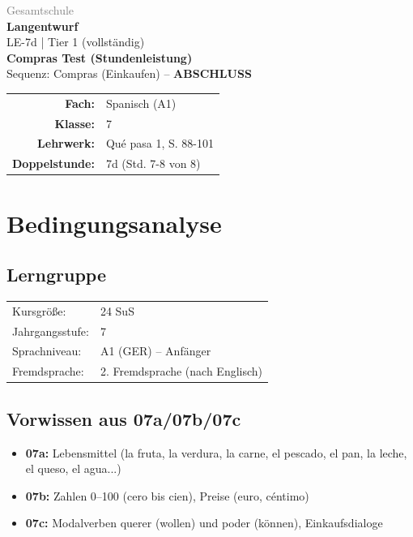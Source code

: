\documentclass[11pt,a4paper]{article}
\newcommand{\fach}{Spanisch}
\newcommand{\jahrgangsstufe}{7}
\newcommand{\schulart}{Gesamtschule}
\newcommand{\stundenthema}{Compras Test (Stundenleistung)}
\newcommand{\reihenthema}{Compras (Einkaufen)}
\newcommand{\stundennummer}{7d}
\newcommand{\lehrwerk}{Qué pasa 1}
\newcommand{\lehrwerkseite}{S. 88-101}
\newcommand{\lerngruppengroesse}{24}
\begin{document}
\begin{titlepage}
    \centering
    \vspace*{2cm}
    {\large\textcolor{gray}{\schulart}}\\[2cm]
    {\Huge\textcolor{fach}{\textbf{Langentwurf}}}\\[0.5cm]
    {\large LE-\stundennummer{} | Tier 1 (vollständig)}\\[2cm]
    {\LARGE\textbf{\stundenthema}}\\[0.5cm]
    {\large Sequenz: \reihenthema{} -- \textbf{ABSCHLUSS}}\\[2cm]
    \begin{tabular}{rl}
        \textbf{Fach:} & \fach{} (A1) \\[0.3cm]
        \textbf{Klasse:} & \jahrgangsstufe \\[0.3cm]
        \textbf{Lehrwerk:} & \lehrwerk, \lehrwerkseite \\[0.3cm]
        \textbf{Doppelstunde:} & \stundennummer{} (Std. 7-8 von 8) \\[0.3cm]
    \end{tabular}
    \vfill
\end{titlepage}

\tableofcontents
\newpage

\section{Bedingungsanalyse}

\subsection{Lerngruppe}
\begin{tabular}{ll}
    Kursgröße: & \lerngruppengroesse{} SuS \\
    Jahrgangsstufe: & \jahrgangsstufe \\
    Sprachniveau: & A1 (GER) -- Anfänger \\
    Fremdsprache: & 2. Fremdsprache (nach Englisch) \\
\end{tabular}

\subsection{Vorwissen aus 07a/07b/07c}
\begin{itemize}
    \item \textbf{07a:} Lebensmittel (la fruta, la verdura, la carne, el pescado, el pan, la leche, el queso, el agua...)
    \item \textbf{07b:} Zahlen 0--100 (cero bis cien), Preise (euro, céntimo)
    \item \textbf{07c:} Modalverben querer (wollen) und poder (können), Einkaufsdialoge
\end{itemize}
\end{document}
